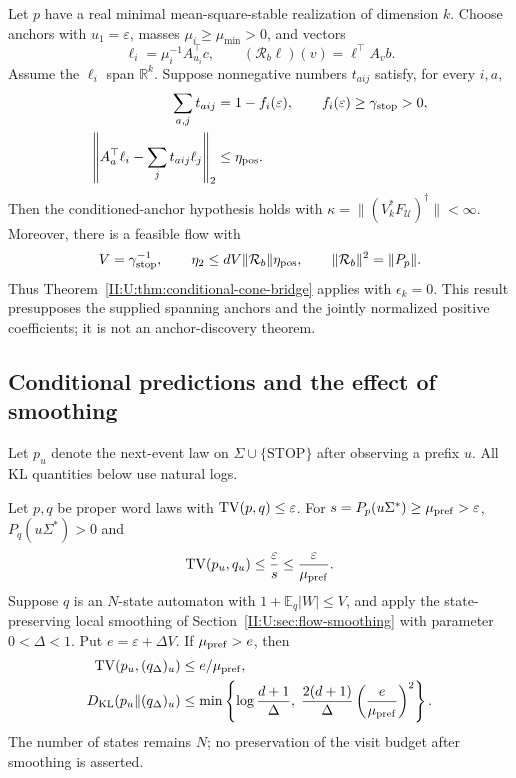 \begin{theorem}
\label{II:U:thm:dual-positive-closure}
Let $p$ have a real minimal mean-square-stable realization of dimension
$k$. Choose anchors with $u_1=\varepsilon$, masses
$\mu_i\ge\mu_{\min}>0$, and vectors
\[
 \ell_i=\mu_i^{-1}A_{u_i}^\top c,\qquad
 (\mathcal R_b\ell)(v)=\ell^\top A_vb.
\]
Assume the $\ell_i$ span $\mathbb R^k$. Suppose nonnegative numbers
$t_{aij}$ satisfy, for every $i,a$,
\begin{align}
 \sum_{a,j}t_{aij}&=1-f_i(\varepsilon),\qquad
 f_i(\varepsilon)\ge\gamma_{\rm stop}>0,\notag\\
 \left\|A_a^\top\ell_i-\sum_jt_{aij}\ell_j\right\|_2
 &\le\eta_{\rm pos}.\label{II:U:eq:dual-positive-hypothesis}
\end{align}
Then the conditioned-anchor hypothesis holds with
$\kappa=\|(V_k^*F_{\mathcal U})^\dagger\|<\infty$.
Moreover, there is a feasible flow with
\[
 V=\gamma_{\rm stop}^{-1},\qquad
 \eta_2\le dV\|\mathcal R_b\|\eta_{\rm pos},\qquad
 \|\mathcal R_b\|^2=\|P_p\|.
\]
Thus Theorem~\ref{II:U:thm:conditional-cone-bridge} applies with
$\epsilon_k=0$. This result presupposes the supplied spanning anchors
and the jointly normalized positive coefficients; it is not an
anchor-discovery theorem.
\end{theorem}


\subsection{Conditional predictions and the effect of smoothing}
\label{II:U:sec:conditional-event-bounds}
Let $p_u$ denote the next-event law on $\Sigma\cup\{\mathrm{STOP}\}$
after observing a prefix $u$. All KL quantities below use natural logs.

\begin{theorem}
\label{II:U:thm:conditional-event-bounds}
Let $p,q$ be proper word laws with $\operatorname{TV}(p,q)\le\varepsilon$.
For $s=P_p(u\Sigma^*)\ge\mu_{\rm pref}>\varepsilon$,
$P_q(u\Sigma^*)>0$ and
\begin{equation}
 \operatorname{TV}(p_u,q_u)\le\frac{\varepsilon}{s}
                         \le\frac{\varepsilon}{\mu_{\rm pref}}.
 \label{II:U:eq:conditional-event-tv}
\end{equation}
Suppose $q$ is an $N$-state automaton with
$1+\mathbb E_q|W|\le V$, and apply the state-preserving local smoothing
of Section~\ref{II:U:sec:flow-smoothing} with parameter $0<\Delta<1$.
Put $e=\varepsilon+\Delta V$. If $\mu_{\rm pref}>e$, then
\begin{align}
 \operatorname{TV}(p_u,(q_\Delta)_u)&\le e/\mu_{\rm pref},\notag\\
 D_{\rm KL}(p_u\|(q_\Delta)_u)
 &\le\min\left\{\log\frac{d+1}{\Delta},\;
 \frac{2(d+1)}{\Delta}\left(\frac e{\mu_{\rm pref}}\right)^2
 \right\}.\label{II:U:eq:conditional-event-kl}
\end{align}
The number of states remains $N$; no preservation of the visit budget
after smoothing is asserted.
\end{theorem}


